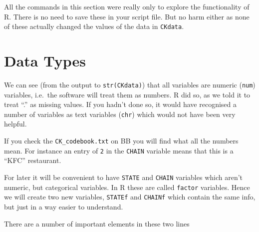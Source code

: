 \documentclass[
]{article}
\newenvironment{Shaded}{\begin{snugshade}}{\end{snugshade}}
\newcommand{\CommentTok}[1]{\textcolor[rgb]{0.56,0.35,0.01}{\textit{#1}}}
\newcommand{\FunctionTok}[1]{\textcolor[rgb]{0.13,0.29,0.53}{\textbf{#1}}}
\newcommand{\NormalTok}[1]{#1}
\newcommand{\OtherTok}[1]{\textcolor[rgb]{0.56,0.35,0.01}{#1}}
\newcommand{\SpecialCharTok}[1]{\textcolor[rgb]{0.81,0.36,0.00}{\textbf{#1}}}
\newcommand{\StringTok}[1]{\textcolor[rgb]{0.31,0.60,0.02}{#1}}
\begin{document}
All the commands in this section were really only to explore the
functionality of R. There is no need to save these in your script file.
But no harm either as none of these actually changed the values of the
data in \texttt{CKdata}.

\hypertarget{data-types}{%
\section{Data Types}\label{data-types}}

We can see (from the output to \texttt{str(CKdata)}) that all variables
are numeric (\texttt{num}) variables, i.e.~the software will treat them
as numbers. R did so, as we told it to treat ``.'' as missing values. If
you hadn't done so, it would have recognised a number of variables as
text variables (\texttt{chr}) which would not have been very helpful.

If you check the \texttt{CK\_codebook.txt} on BB you will find what all
the numbers mean. For instance an entry of \texttt{2} in the
\texttt{CHAIN} variable means that this is a ``KFC'' restaurant.

For later it will be convenient to have \texttt{STATE} and
\texttt{CHAIN} variables which aren't numeric, but categorical
variables. In R these are called \texttt{factor} variables. Hence we
will create two new variables, \texttt{STATEf} and \texttt{CHAINf} which
contain the same info, but just in a way easier to understand.

\begin{Shaded}
\end{Shaded}

There are a number of important elements in these two lines
\end{document}
